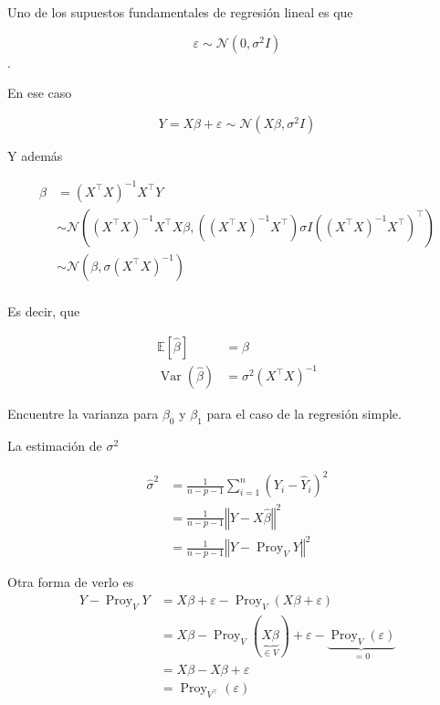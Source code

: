 \documentclass[
  12pt,
]{book}
\theoremstyle{definition}
\theoremstyle{definition}
\theoremstyle{definition}
\theoremstyle{remark}
\let\BeginKnitrBlock\begin \let\EndKnitrBlock\end
\begin{document}
Uno de los supuestos fundamentales de regresión lineal es que

\begin{equation*}
\varepsilon\sim \mathcal{N}\left(0,\sigma^{2}I\right)
\end{equation*} .

En ese caso

\begin{equation*}
Y = X\beta + \varepsilon \sim \mathcal{N}\left(X\beta,\sigma^{2}I\right)
\end{equation*}

Y además

\begin{align*}
\hat{\beta} &=  (X^{\top}X)^{-1}X^{\top}Y \\
&\sim  \mathcal{N}\left((X^{\top}X)^{-1}X^{\top}X\beta,((X^{\top}X)^{-1}X^{\top})\sigma I ((X^{\top}X)^{-1}X^{\top})^{\top}\right) \\
&\sim  \mathcal{N}\left(\beta,\sigma (X^{\top}X)^{-1}\right) \\
\end{align*}

Es decir, que

\begin{align*}
\mathbb{E}\left[\hat{\beta}\right] &= \beta \\
\operatorname{Var}(\hat{\beta}) &=  \sigma^{2}\left(X^{\top} X\right)^{-1}
\end{align*}

\BeginKnitrBlock{exercise}
\protect\hypertarget{exr:unnamed-chunk-180}{}{\label{exr:unnamed-chunk-180} }Encuentre la varianza para \(\beta_{0}\) y \(\beta_{1}\) para el caso de la regresión simple.
\EndKnitrBlock{exercise}

La estimación de \(\sigma^{2}\)

\begin{align*}
 \hat{\sigma}^{2} 
 &=  \frac{1}{n-p-1} \sum_{i=1}^{n} \left( Y_{i} - \hat{Y}_{i}\right)^{2} \\
 &= \frac{1}{n-p-1}\left\Vert Y - X\hat{\beta} \right\Vert^{2} \\
 &=   \frac{1}{n-p-1} \left\Vert Y-\operatorname{Proy}_{V}Y \right\Vert^{2} 
 \end{align*}

Otra forma de verlo es
\begin{align*}
Y-\operatorname{Proy}_{V}Y  
&= X\beta + \varepsilon -  \operatorname{Proy}_{V}( X\beta + \varepsilon) \\
&= X\beta - \operatorname{Proy}_{V}( \underbrace{X\beta}_{\in V}) + \varepsilon - \underbrace{\operatorname{Proy}_{V}( \varepsilon)}_{=0} \\
&= X\beta -X\beta + \varepsilon \\
&=  \operatorname{Proy}_{V^{\top}}( \varepsilon)
 \end{align*}
\end{document}
